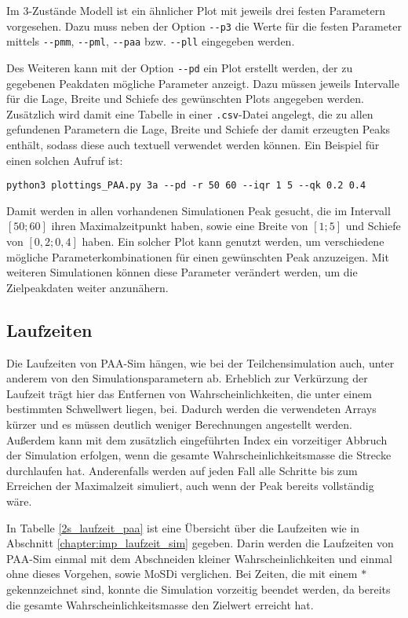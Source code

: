 Im 3-Zustände Modell ist ein ähnlicher Plot mit jeweils drei festen Parametern vorgesehen. Dazu muss neben der Option \verb!--p3! die Werte für die festen Parameter mittels \verb!--pmm!, \verb!--pml!, \verb!--paa! bzw. \verb!--pll! eingegeben werden.

Des Weiteren kann mit der Option \verb!--pd! ein Plot erstellt werden, der zu gegebenen Peakdaten mögliche Parameter anzeigt. Dazu müssen jeweils Intervalle für die Lage, Breite und Schiefe des gewünschten Plots angegeben werden. Zusätzlich wird damit eine Tabelle in einer \verb!.csv!-Datei angelegt, die zu allen gefundenen Parametern die Lage, Breite und Schiefe der damit erzeugten Peaks enthält, sodass diese auch textuell verwendet werden können.
Ein Beispiel für einen solchen Aufruf ist:
\begin{verbatim}
python3 plottings_PAA.py 3a --pd -r 50 60 --iqr 1 5 --qk 0.2 0.4
\end{verbatim}
Damit werden in allen vorhandenen Simulationen Peak gesucht, die im Intervall $[50; 60]$ ihren Maximalzeitpunkt haben, sowie eine Breite von $[1;5]$ und Schiefe von $[0,2; 0,4]$ haben. Ein solcher Plot kann genutzt werden, um verschiedene mögliche Parameterkombinationen für einen gewünschten Peak anzuzeigen. Mit weiteren Simulationen können diese Parameter verändert werden, um die Zielpeakdaten weiter anzunähern.


\subsection{Laufzeiten}
Die Laufzeiten von PAA-Sim hängen, wie bei der Teilchensimulation auch, unter anderem von den Simulationsparametern ab. Erheblich zur Verkürzung der Laufzeit trägt hier das Entfernen von Wahrscheinlichkeiten, die unter einem bestimmten Schwellwert liegen, bei. Dadurch werden die verwendeten Arrays kürzer und es müssen deutlich weniger Berechnungen angestellt werden. Außerdem kann mit dem zusätzlich eingeführten Index ein vorzeitiger Abbruch der Simulation erfolgen, wenn die gesamte Wahrscheinlichkeitsmasse die Strecke durchlaufen hat. Anderenfalls werden auf jeden Fall alle Schritte bis zum Erreichen der Maximalzeit simuliert, auch wenn der Peak bereits vollständig wäre.

In Tabelle \ref{2s_laufzeit_paa} ist eine Übersicht über die Laufzeiten wie in Abschnitt \ref{chapter:imp_laufzeit_sim} gegeben. Darin werden die Laufzeiten von PAA-Sim einmal mit dem Abschneiden kleiner Wahrscheinlichkeiten und einmal ohne dieses Vorgehen, sowie MoSDi verglichen. Bei Zeiten, die mit einem $*$ gekennzeichnet sind, konnte die Simulation vorzeitig beendet werden, da bereits die gesamte Wahrscheinlichkeitsmasse den Zielwert erreicht hat.

